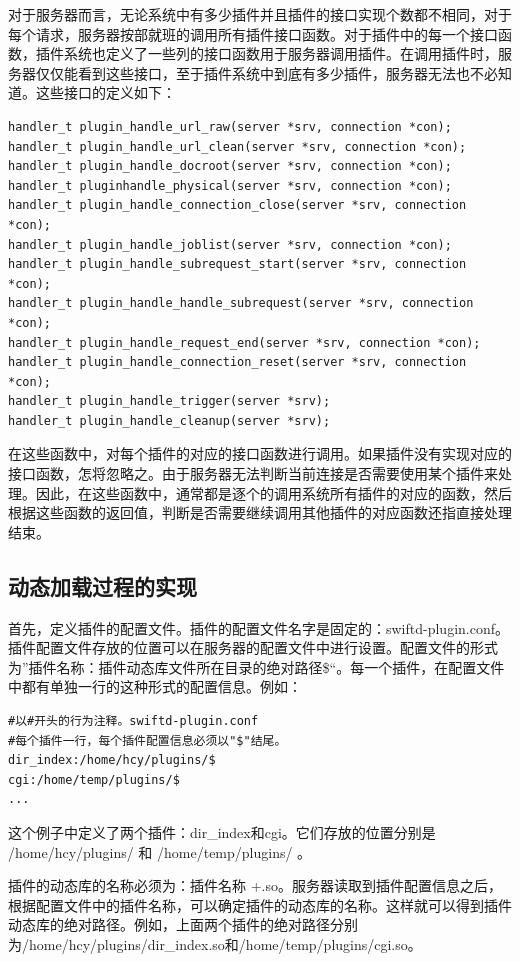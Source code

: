 \documentclass[twoside, xetex]{report}
\begin{document}
	对于服务器而言，无论系统中有多少插件并且插件的接口实现个数都不相同，对于每个请求，服务器按部就班的调用所有插件接口函数。对于插件中的每一个接口函数，插件系统也定义了一些列的接口函数用于服务器调用插件。在调用插件时，服务器仅仅能看到这些接口，至于插件系统中到底有多少插件，服务器无法也不必知道。这些接口的定义如下：
	
\begin{lstlisting}
handler_t plugin_handle_url_raw(server *srv, connection *con);
handler_t plugin_handle_url_clean(server *srv, connection *con);
handler_t plugin_handle_docroot(server *srv, connection *con);
handler_t pluginhandle_physical(server *srv, connection *con);
handler_t plugin_handle_connection_close(server *srv, connection *con);
handler_t plugin_handle_joblist(server *srv, connection *con);
handler_t plugin_handle_subrequest_start(server *srv, connection *con);
handler_t plugin_handle_handle_subrequest(server *srv, connection *con);
handler_t plugin_handle_request_end(server *srv, connection *con);
handler_t plugin_handle_connection_reset(server *srv, connection *con);
handler_t plugin_handle_trigger(server *srv);
handler_t plugin_handle_cleanup(server *srv);
\end{lstlisting}

	在这些函数中，对每个插件的对应的接口函数进行调用。如果插件没有实现对应的接口函数，怎将忽略之。由于服务器无法判断当前连接是否需要使用某个插件来处理。因此，在这些函数中，通常都是逐个的调用系统所有插件的对应的函数，然后根据这些函数的返回值，判断是否需要继续调用其他插件的对应函数还指直接处理结束。
	
\subsection{动态加载过程的实现}
	首先，定义插件的配置文件。插件的配置文件名字是固定的：swiftd-plugin.conf。插件配置文件存放的位置可以在服务器的配置文件中进行设置。配置文件的形式为”插件名称：插件动态库文件所在目录的绝对路径\$“。每一个插件，在配置文件中都有单独一行的这种形式的配置信息。例如：

\begin{lstlisting}
#以#开头的行为注释。swiftd-plugin.conf
#每个插件一行，每个插件配置信息必须以"$"结尾。
dir_index:/home/hcy/plugins/$
cgi:/home/temp/plugins/$
...
\end{lstlisting}

	这个例子中定义了两个插件：dir\_index和cgi。它们存放的位置分别是 /home/hcy/plugins/ 和 /home/temp/plugins/ 。
	
	插件的动态库的名称必须为：插件名称 +.so。服务器读取到插件配置信息之后，根据配置文件中的插件名称，可以确定插件的动态库的名称。这样就可以得到插件动态库的绝对路径。例如，上面两个插件的绝对路径分别为/home/hcy/plugins/dir\_index.so和/home/temp/plugins/cgi.so。
	
\end{document}
